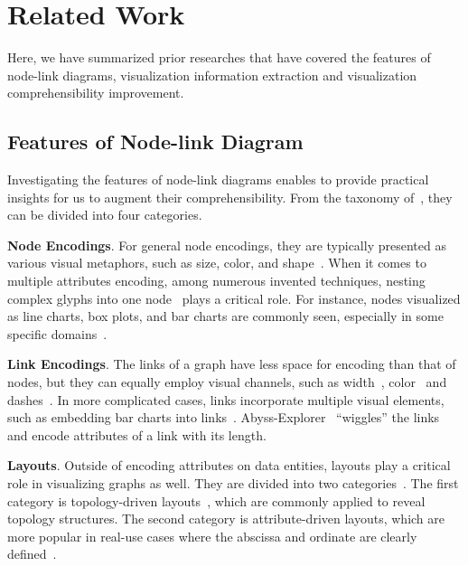 \section{Related Work}\label{sec:relatedwork}

Here, we have summarized prior researches that have covered the features of node-link diagrams, visualization information extraction and visualization comprehensibility improvement.

\subsection{Features of Node-link Diagram}
Investigating the features of node-link diagrams enables to provide practical insights for us to augment their comprehensibility. From the taxonomy of~\cite{DBLP:journals/cgf/NobreMSL19}, they can be divided into four categories.

\noindent \textbf{Node Encodings}. 
For general node encodings, they are typically presented as various visual metaphors, such as size, color, and shape~\cite{tvcg/RomatAP21}. When it comes to multiple attributes encoding, among numerous invented techniques, nesting complex glyphs into one node~\cite{DBLP:conf/infovis/AuberCJM03} plays a critical role. For instance, nodes visualized as line charts, box plots, and bar charts are commonly seen, especially in some specific domains~\cite{DBLP:conf/infovis/Jankun-KellyM03, DBLP:journals/bmcbi/JunkerKS06, DBLP:conf/iv/JusufiDK10}.

\noindent \textbf{Link Encodings}.
The links of a graph have less space for encoding than that of nodes, but they can equally employ visual channels, such as width~\cite{Katz_2015}, color~\cite{DBLP:journals/tvcg/Guo09} and dashes~\cite{DBLP:journals/bmcbi/JunkerKS06}.
In more complicated cases, links incorporate multiple visual elements, such as embedding bar charts into links~\cite{DBLP:conf/iv/SchoffelSE16}. Abyss-Explorer~\cite{DBLP:journals/tvcg/NielsenJBJ09} ``wiggles'' the links and encode attributes of a link with its length.

\noindent \textbf{Layouts}.
Outside of encoding attributes on data entities, layouts play a critical role in visualizing graphs as well. They are divided into two categories~\cite{DBLP:journals/cgf/NobreMSL19}. The first category is topology-driven layouts~\cite{DBLP:journals/spe/FruchtermanR91, DBLP:journals/cgf/KruigerRMKKT17, DBLP:journals/tvcg/GansnerHN13, DBLP:journals/tvcg/ZhuCHHLZ21}, which are commonly applied to reveal topology structures. The second category is attribute-driven layouts, which are more popular in real-use cases where the abscissa and ordinate are clearly defined~\cite{DBLP:journals/tvcg/ElzenW14, DBLP:journals/tvcg/Guo09}. 

